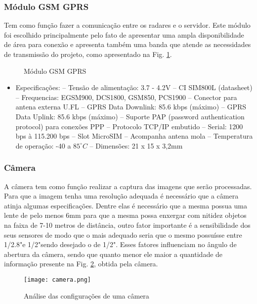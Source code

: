  \subsubsection{Módulo GSM GPRS}
 
Tem como função fazer a comunicação entre os radares e o servidor. Este módulo foi escolhido principalmente pelo fato de apresentar uma ampla disponibilidade de área para conexão e apresenta também uma banda que atende as necessidades de transmissão do projeto, como apresentado na Fig. \ref{fig:gsm}.

 
\begin{figure}[!htb]
	\caption{\label{fig:gsm} Módulo GSM  GPRS}
\end{figure}

 \begin{itemize}
    
\item Especificações:
–  Tensão de alimentação: 3.7 - 4.2V
– CI SIM800L (datasheet)
– Frequencias: EGSM900, DCS1800, GSM850, PCS1900
– Conector para antena externa U.FL
– GPRS Data Downlink: 85.6 kbps (máximo)
– GPRS Data Uplink: 85.6 kbps (máximo)
– Suporte PAP (password authentication protocol) para conexões PPP
– Protocolo TCP/IP embutido
– Serial: 1200 bps à 115.200 bps
– Slot MicroSIM
– Acompanha antena mola
– Temperatura de operação: -40 a $85^{\circ}C$
– Dimensões: 21 x 15 x 3,2mm
\end{itemize}

\subsubsection{Câmera} 

A câmera tem como função realizar a captura das imagens que serão processadas.  Para que a imagem tenha uma resolução adequada é necessário que a câmera atinja algumas especificações. Dentre elas é necessário que a mesma possua uma lente de pelo menos 6mm para que a mesma possa enxergar com nitidez objetos na faixa de 7-10 metros de distância, outro fator importante é a sensibilidade dos seus sensores de modo que o mais adequado seria que o mesmo possuísse entre 1/2.8"e 1/2"sendo desejado o de 1/2". Esses fatores influenciam no ângulo de abertura da câmera, sendo que quanto menor ele maior a quantidade de informação presente na Fig. \ref{fig:camera}, obtida pela câmera.
\pagebreak

\begin{figure}[!htbp]
    \centering
        \texttt{[image: camera.png]} 
    \caption{Análise das configurações de uma câmera}
    \label{fig:camera}
\end{figure}

